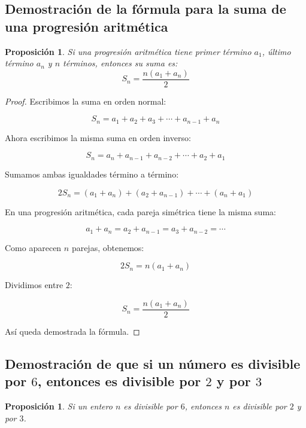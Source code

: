 \documentclass[12pt,final]{report}
\theoremstyle{plain}
\newtheorem{proposition}[theorem]{Proposición}
\theoremstyle{definition}
\begin{document}
\newpage

\subsection{Demostración de la fórmula para la suma de una progresión aritmética}

\begin{proposition}
Si una progresión aritmética tiene primer término $a_1$, último término $a_n$ y $n$ términos, entonces su suma es:
\[
S_n=\frac{n(a_1+a_n)}{2}
\]
\end{proposition}

\begin{proof}

Escribimos la suma en orden normal:

\[
S_n=a_1+a_2+a_3+\cdots+a_{n-1}+a_n
\]

Ahora escribimos la misma suma en orden inverso:

\[
S_n=a_n+a_{n-1}+a_{n-2}+\cdots+a_2+a_1
\]

Sumamos ambas igualdades término a término:

\[
2S_n=(a_1+a_n)+(a_2+a_{n-1})+\cdots+(a_n+a_1)
\]

En una progresión aritmética, cada pareja simétrica tiene la misma suma:

\[
a_1+a_n=a_2+a_{n-1}=a_3+a_{n-2}=\cdots
\]

Como aparecen $n$ parejas, obtenemos:

\[
2S_n=n(a_1+a_n)
\]

Dividimos entre $2$:

\[
S_n=\frac{n(a_1+a_n)}{2}
\]

Así queda demostrada la fórmula.

\end{proof}

\newpage

\subsection{Demostración de que si un número es divisible por $6$, entonces es divisible por $2$ y por $3$}

\begin{proposition}
Si un entero $n$ es divisible por $6$, entonces $n$ es divisible por $2$ y por $3$.
\end{proposition}
\end{document}
